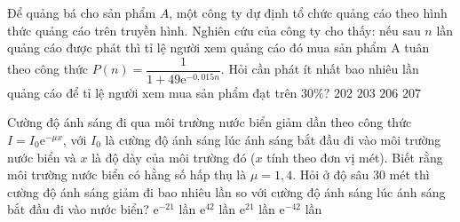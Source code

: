 \begin{ex}%
    [Đề Tham Khảo 2020 Lần 2]%
    Để quảng bá cho sản phẩm $A$, một công ty dự định tổ chức quảng cáo theo hình thức quảng cáo trên truyền hình. Nghiên cứu của công ty cho thấy: nếu sau $ n$ lần quảng cáo được phát thì tỉ lệ người xem quảng cáo đó mua sản phẩm A tuân theo công thức $ P(n)=\dfrac{1}{1+49\mathrm{e}^{-0{,}015n}}$. Hỏi cần phát ít nhất bao nhiêu lần quảng cáo để tỉ lệ người xem mua sản phẩm đạt trên $ 30\%?$
    \choice
    {$ 202$}
    {\True $ 203$}
    {$ 206$}
    {$ 207$}
\end{ex}
\begin{ex}%
    [Sở Hà Nội 2019]%
    Cường độ ánh sáng đi qua môi trường nước biển giảm dần theo công thức $ I=I_0\mathrm{e}^{-\mu x}$, với $I_0$ là cường độ ánh sáng lúc ánh sáng bắt đầu đi vào môi trường nước biển và $ x$ là độ dày của môi trường đó ($ x$ tính theo đơn vị mét). Biết rằng môi trường nước biển có hằng số hấp thụ là $\mu=1{,}4$. Hỏi ở độ sâu 30 mét thì cường độ ánh sáng giảm đi bao nhiêu lần so với cường độ ánh sáng lúc ánh sáng bắt đầu đi vào nước biển?
    \choice
    {$\mathrm{e}^{-21}$ lần}
    {\True $\mathrm{e}^{42}$ lần}
    {$\mathrm{e}^{21}$ lần}
    {$\mathrm{e}^{-42}$ lần}
\end{ex}
